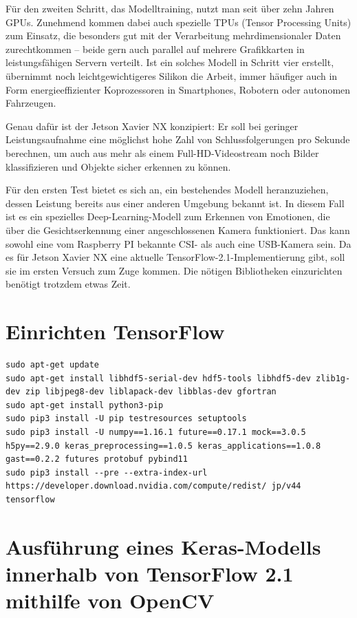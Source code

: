 Für den zweiten Schritt, das Modelltraining, nutzt man seit über zehn Jahren GPUs. Zunehmend kommen dabei auch spezielle TPUs (Tensor Processing Units) zum Einsatz, die besonders gut mit der Verarbeitung mehrdimensionaler Daten zurechtkommen – beide gern auch parallel auf mehrere Grafikkarten in leistungsfähigen Servern verteilt. Ist ein solches Modell in Schritt vier erstellt, übernimmt noch leichtgewichtigeres Silikon die Arbeit, immer häufiger auch in Form energieeffi­zienter Koprozessoren in Smartphones, Robotern oder autonomen Fahrzeugen. 

Genau dafür ist der Jetson Xavier NX konzipiert: Er soll bei geringer Leistungsaufnahme eine möglichst hohe Zahl von Schlussfolgerungen pro Sekunde berechnen, um auch aus mehr als einem Full-HD-­Videostream noch Bilder klassifizieren und Objekte sicher erkennen zu können. 

Für den ersten Test bietet es sich an, ein bestehendes Modell heranzuziehen, dessen Leistung bereits aus einer anderen Um­gebung bekannt ist. In diesem Fall ist es ein spezielles Deep-Learning-Modell zum Erkennen von Emotionen, die über die Gesichtserkennung einer angeschlossenen Kamera funktioniert. Das kann sowohl eine vom Raspberry PI bekannte CSI- als auch eine USB-Kamera sein. Da es für Jetson Xavier NX eine aktuelle TensorFlow-­2.1-Implementierung gibt, soll sie im ersten Versuch zum Zuge kommen. Die nötigen Bibliotheken einzurichten benötigt trotzdem etwas Zeit. 

\section{Einrichten TensorFlow}

\begin{lstlisting}
sudo apt-get update
sudo apt-get install libhdf5-serial-dev hdf5-tools libhdf5-dev zlib1g-dev zip libjpeg8-dev liblapack-dev libblas-dev gfortran
sudo apt-get install python3-pip
sudo pip3 install -U pip testresources setuptools
sudo pip3 install -U numpy==1.16.1 future==0.17.1 mock==3.0.5 h5py==2.9.0 keras_preprocessing==1.0.5 keras_applications==1.0.8 gast==0.2.2 futures protobuf pybind11
sudo pip3 install --pre --extra-index-url https://developer.download.nvidia.com/compute/redist/ jp/v44 tensorflow
\end{lstlisting}

\section{Ausführung eines Keras-Modells innerhalb von TensorFlow 2.1 mithilfe von OpenCV}
	

